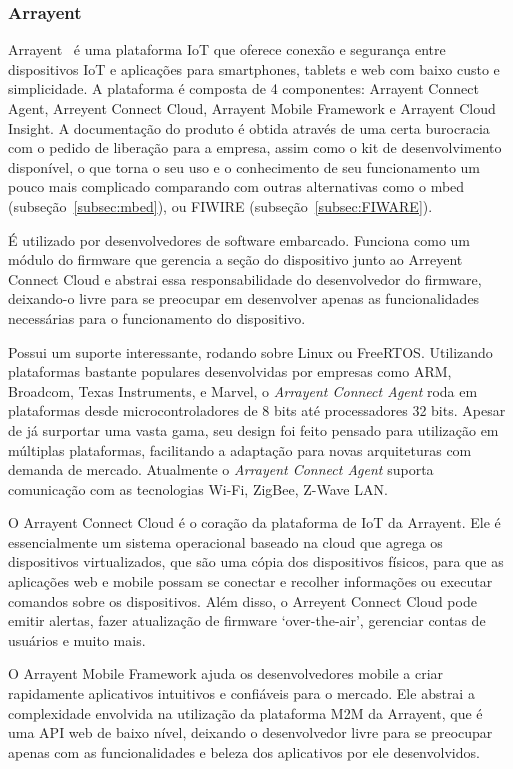 \subsubsection{Arrayent}
Arrayent~\cite{arrayent} é uma plataforma IoT que oferece conexão e segurança entre dispositivos IoT e aplicações
para  smartphones, tablets e web com baixo custo e simplicidade. A plataforma é composta de 4 componentes:
Arrayent Connect Agent, Arreyent Connect Cloud, Arrayent Mobile Framework e Arrayent Cloud Insight.
A documentação do produto é obtida através de uma certa burocracia com o pedido de liberação para
a empresa, assim como o kit de desenvolvimento disponível, o que torna o seu uso e o
conhecimento de seu funcionamento um pouco mais complicado comparando com outras alternativas como o
mbed (subseção~\ref{subsec:mbed}), ou FIWIRE (subseção~\ref{subsec:FIWARE}).

É utilizado por desenvolvedores de software embarcado. Funciona como um módulo do firmware que gerencia a
seção do dispositivo junto ao Arreyent Connect Cloud e abstrai essa responsabilidade do desenvolvedor
do firmware, deixando-o livre para se preocupar em desenvolver apenas as funcionalidades necessárias para o
funcionamento do dispositivo.

Possui um suporte interessante, rodando sobre Linux ou FreeRTOS. Utilizando plataformas bastante populares
desenvolvidas por empresas como ARM, Broadcom, Texas Instruments, e Marvel, o \textit{Arrayent Connect Agent} roda
em plataformas desde microcontroladores de 8 bits até processadores 32 bits. Apesar de já surportar
uma vasta gama, seu design foi feito pensado para utilização em múltiplas plataformas, facilitando a
adaptação para novas arquiteturas com demanda de mercado. Atualmente o \textit{Arrayent Connect Agent}
suporta comunicação com as tecnologias Wi-Fi, ZigBee, Z-Wave LAN.

O Arrayent Connect Cloud é o coração da plataforma de IoT da Arrayent. Ele é essencialmente um sistema
operacional baseado na cloud que agrega os dispositivos virtualizados, que são uma cópia dos dispositivos
físicos, para que as aplicações web e mobile possam se conectar e recolher informações ou executar comandos
sobre os dispositivos. Além disso, o Arreyent Connect Cloud pode emitir alertas, fazer atualização de firmware
\lq over-the-air\rq, gerenciar contas de usuários e muito mais.

O Arrayent Mobile Framework ajuda os desenvolvedores mobile a criar rapidamente aplicativos intuitivos e
confiáveis para o mercado. Ele abstrai a complexidade envolvida na utilização da plataforma M2M da Arrayent,
que é uma API web de baixo nível, deixando o desenvolvedor livre para se preocupar apenas com as funcionalidades
e beleza dos aplicativos por ele desenvolvidos.

